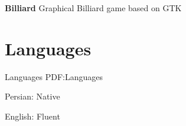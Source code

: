 \documentclass[a4paper,9pt,oneside]{article}
\begin{document}
\begin{body}
\BulletItem
{\textbf{Billiard}
\hfill
{}
}
\SubBulletItem
Graphical Billiard game based on GTK




\section
{Languages}
{Languages}
{PDF:Languages}

\BulletItem
Persian: Native

\GapNoBreak
\BulletItem
English: Fluent



\end{body}

\end{document}
